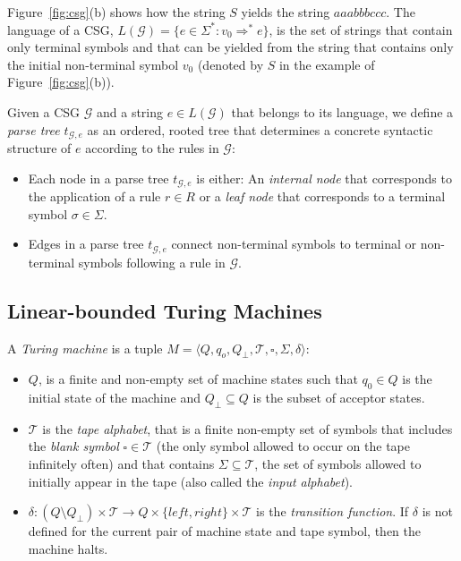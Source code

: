 \documentclass[letterpaper]{article} %
\newcommand{\tup}[1]{{\langle #1 \rangle}}
\begin{document}
Figure~\ref{fig:csg}(b) shows how the string $S$ yields the string $aaabbbccc$. The language of a CSG, $L(\mathcal{G})=\{e\in \Sigma^*: v_0\Rightarrow^* e\}$, is the set of strings that contain only terminal symbols and that can be yielded from the string that contains only the initial non-terminal symbol $v_0$ (denoted by $S$ in the example of Figure~\ref{fig:csg}(b)).

Given a CSG $\mathcal{G}$ and a string $e\in L(\mathcal{G})$ that belongs to its language, we define a {\it parse tree} $t_{\mathcal{G},e}$ as an ordered, rooted tree that determines a concrete syntactic structure of $e$ according to the rules in $\mathcal{G}$:
\begin{itemize}
\item Each node in a parse tree $t_{\mathcal{G},e}$ is either: An {\it internal node} that corresponds to the application of a rule $r\in R$ or a {\it leaf node} that corresponds to a terminal symbol $\sigma\in \Sigma$.
\item Edges in a parse tree $t_{\mathcal{G},e}$ connect non-terminal symbols to terminal or non-terminal symbols following a rule in $\mathcal{G}$.
\end{itemize}


\subsection{Linear-bounded Turing Machines}
A {\em Turing machine} is a tuple $M=\tup{Q,q_o,Q_{\bot},\mathcal{T},\square,\Sigma,\delta}$:
\begin{itemize}
\item $Q$, is a finite and non-empty set of machine states such that $q_0\in Q$ is the initial state of the machine and $Q_{\bot}\subseteq Q$ is the subset of acceptor states.  
\item $\mathcal{T}$ is the {\em tape alphabet}, that is a finite non-empty set of symbols that includes the {\em blank symbol} $\square\in\mathcal{T}$ (the only symbol allowed to occur on the tape infinitely often) and that contains $\Sigma\subseteq\mathcal{T}$, the set of symbols allowed to initially appear in the tape (also called the {\em input alphabet}).
\item $\delta: (Q\setminus Q_{\bot})\times \mathcal{T}\rightarrow Q\times\{left,right\}\times \mathcal{T}$ is the {\em transition function}. If $\delta$ is not defined for the current pair of machine state and tape symbol, then the machine halts.
\end{itemize}
\end{document}
